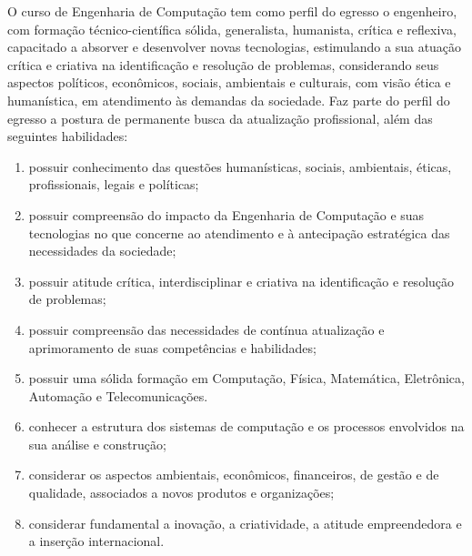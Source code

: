 O curso de Engenharia de Computação tem como perfil do egresso o engenheiro, com formação técnico-científica sólida, generalista, humanista, crítica e reflexiva, capacitado a absorver e desenvolver novas tecnologias, estimulando a sua atuação crítica e criativa na identificação e resolução de problemas, considerando seus aspectos políticos, econômicos, sociais, ambientais e culturais, com visão ética e humanística, em atendimento às demandas da sociedade. Faz parte do perfil do egresso a postura de permanente busca da atualização profissional, além das seguintes habilidades:
\begin{enumerate} [I -]
  \item possuir conhecimento das questões humanísticas, sociais, ambientais, éticas, profissionais, legais e políticas;
  \item possuir compreensão do impacto da Engenharia de Computação e suas tecnologias no que concerne ao atendimento e à antecipação estratégica das necessidades da sociedade;
  \item possuir atitude crítica, interdisciplinar e criativa na identificação e resolução de problemas;
  \item possuir compreensão das necessidades de contínua atualização e aprimoramento de suas competências e habilidades;
  \item possuir uma sólida formação em Computação, Física, Matemática, Eletrônica, Automação e Telecomunicações.
  \item conhecer a estrutura dos sistemas de computação e os processos envolvidos na sua análise e construção;
  \item considerar os aspectos ambientais, econômicos, financeiros, de gestão e de qualidade, associados a novos produtos e organizações;
  \item considerar fundamental a inovação, a criatividade, a atitude empreendedora e a inserção internacional.
\end{enumerate}

